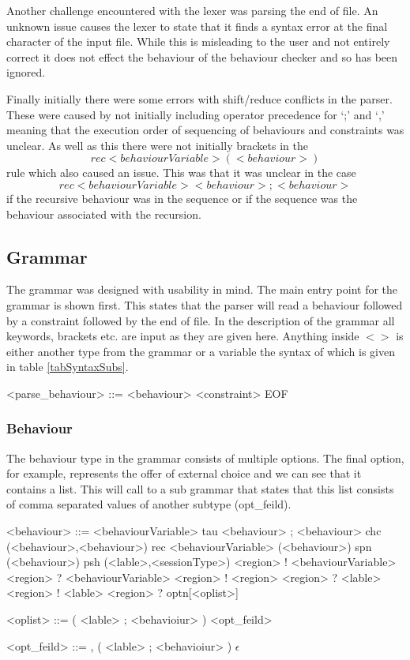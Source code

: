Another challenge encountered with the lexer was parsing the end of file. An unknown issue causes the lexer to state that it finds a syntax error at the final character of the input file. While this is misleading to the user and not entirely correct it does not effect the behaviour of the behaviour checker and so has been ignored. 

Finally initially there were some errors with shift/reduce conflicts in the parser. These were caused by not initially including operator precedence for `;' and `,' meaning that the execution order of sequencing of behaviours and constraints was unclear. As well as this there were not initially brackets in the $$rec <behaviourVariable> (<behaviour>)$$ rule which also caused an issue. This was that it was unclear in the case $$rec <behaviourVariable> <behaviour> ; <behaviour>  $$ if the recursive behaviour was in the sequence or if the sequence was the behaviour associated with the recursion. 

\subsection{Grammar} \label{gram}

The grammar was designed with usability in mind. The main entry point for the grammar is shown first. This states that the parser will read a behaviour followed by a constraint followed by the end of file. In the description of the grammar all keywords, brackets etc. are input as they are given here. Anything inside $< >$ is either another type from the grammar or a variable the syntax of which is given in table \ref{tabSyntaxSubs}.

\begin{grammar}

<parse_behaviour> ::= <behaviour> <constraint> EOF

\end{grammar}

\subsubsection{Behaviour}

The behaviour type in the grammar consists of multiple options. The final option, for example, represents the offer of external choice and we can see that it contains a list. This will call to a sub grammar that states that this list consists of comma separated values of another subtype (opt_feild). 

\begin{grammar}
<behaviour> ::= <behaviourVariable>
\alt tau
\alt <behaviour> ; <behaviour>
\alt chc (<behaviour>,<behaviour>)
\alt rec <behaviourVariable> (<behaviour>)
\alt spn (<behaviour>)
\alt psh (<lable>,<sessionType>)
\alt <region> ! <behaviourVariable>
\alt <region> ? <behaviourVariable>
\alt <region> ! <region>
\alt <region> ? <lable>
\alt <region> ! <lable>
\alt <region> ? optn[<oplist>]

<oplist> ::= ( <lable> ; <behavioiur> ) <opt_feild>

<opt_feild> ::= , ( <lable> ; <behavioiur> )
\alt $\epsilon$

\end{grammar}

